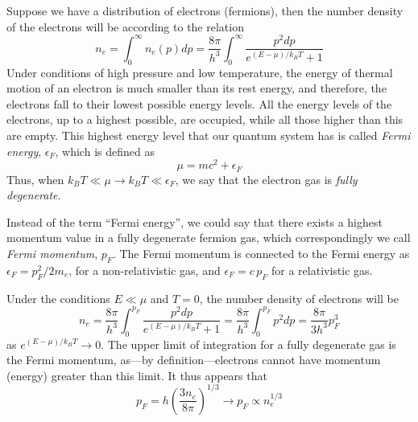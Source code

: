 \documentclass[main.tex]{subfiles}
\begin{document}
Suppose we have a distribution of electrons (fermions), then the number density of the electrons will be according to the relation
\begin{equation}
    n_e = \int_0^{\infty} n_e (p) dp =  \frac{8\pi}{h^3} \int_0^{\infty} \frac{p^2 dp}{e^{(E - \mu)/k_B T} + 1}
\end{equation}
Under conditions of high pressure and low temperature, the energy of thermal motion of an electron is much smaller than its rest energy, and therefore, the electrons fall to their lowest possible energy levels. All the energy levels of the electrons, up to a highest possible, are occupied, while all those higher than this are empty. This highest energy level that our quantum system has is called \textit{Fermi energy}, $\epsilon_F$, which is defined as
$$\mu = mc^2 + \epsilon_F$$
Thus, when $k_B T \ll \mu \rightarrow k_B T \ll \epsilon_F$, we say that the electron gas is \textit{fully degenerate}.

Instead of the term ``Fermi energy'', we could say that there exists a highest momentum value in a fully degenerate fermion gas, which correspondingly we call \textit{Fermi momentum}, $p_F$. The Fermi momentum is connected to the Fermi energy as $\epsilon_F = p_F^2 / 2m_e$, for a non-relativistic gas, and $\epsilon_F = c\,p_F$ for a relativistic gas.

Under the conditions $E \ll \mu$ and $T = 0$, the number density of electrons will be
\begin{equation}
    \label{apx:electron_number_density_degenerate_gas}
    n_e = \frac{8\pi}{h^3} \int_0^{p_F} \frac{p^2 dp}{e^{(E - \mu)/k_B T} + 1} = \frac{8\pi}{h^3} \int_0^{p_F} p^2 dp = \frac{8\pi}{3h^3} p_F^3
\end{equation}
as $e^{(E - \mu)/k_B T} \rightarrow 0$. The upper limit of integration for a fully degenerate gas is the Fermi momentum, as---by definition---electrons cannot have momentum (energy) greater than this limit. It thus appears that
\begin{equation}
    \label{apx:eq:fermi_momentum}
    p_F = h \left( \frac{3 n_e}{8 \pi} \right)^{1/3} \longrightarrow p_F \propto n_e^{1/3}
\end{equation}
\end{document}
